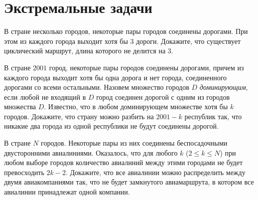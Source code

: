 \section{Экстремальные задачи}

\begin{exersize}
	В стране несколько городов, некоторые пары городов соединены дорогами. При этом из каждого города выходит хотя бы $3$ дороги. Докажите, что существует циклический маршрут, длина которого не делится на $3$.
\end{exersize}	 

\begin{exersize}
	В стране $2001$ город, некоторые пары городов соединены дорогами, причем из каждого города выходит хотя бы одна дорога и нет города, соединенного дорогами со всеми остальными. Назовем множество городов $D$ \emph{доминирующим}, если любой не входящий в $D$ город соединен дорогой с одним из городов множества $D$. Известно, что в любом доминирующем множестве хотя бы $k$ городов. Докажите, что страну можно разбить на $2001-k$ республик так, что никакие два города из одной республики не будут соединены дорогой.
\end{exersize}	 

\begin{exersize}
	В стране $N$ городов. Некоторые пары из них соединены беспосадочными двусторонними авиалиниями. Оказалось, что для любого $k$ ($2 \leqslant k \leqslant N$) при любом выборе городов количество авиалиний между этими городами не будет превосходить $2k-2$. Докажите, что все авиалинии можно распределить между двумя авиакомпаниями так, что не будет замкнутого авиамаршрута, в котором все авиалинии принадлежат одной компании.
\end{exersize}	 